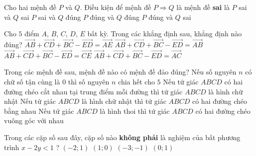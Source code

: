 \begin{ex}%
Cho hai mệnh đề $P$ và $Q$. Điều kiện để mệnh đề $P\Rightarrow Q$ là mệnh đề \textbf{sai} là
\choice
{$P$ sai và $Q$ sai}
{$P$ sai và $Q$ đúng}
{$P$ đúng và $Q$ đúng}
{\True $P$ đúng và $Q$ sai}
\end{ex}

\begin{ex}%
Cho $5$ điểm $A$, $B$, $C$, $D$, $E$ bất kỳ. Trong các khẳng định sau, khẳng định nào đúng?
\choice
{\True $\vec{AB}+\vec{CD}+\vec{BC}-\vec{ED}=\vec{AE}$}
{$\vec{AB}+\vec{CD}+\vec{BC}-\vec{ED}=\vec{AB}$}
{$\vec{AB}+\vec{CD}+\vec{BC}-\vec{ED}=\vec{CE}$}
{$\vec{AB}+\vec{CD}+\vec{BC}-\vec{ED}=\vec{AC}$}
\end{ex}

\begin{ex}%
Trong các mệnh đề sau, mệnh đề nào có mệnh đề đảo đúng?
\choice
{Nếu số nguyên $n$ có chữ số tận cùng là $0$ thì số nguyên $n$ chia hết cho $5$}
{\True Nếu tứ giác $ABCD$ có hai đường chéo cắt nhau tại trung điểm mỗi đường thì tứ giác $ABCD$ là hình chữ nhật}
{Nếu tứ giác $ABCD$ là hình chữ nhật thì tứ giác $ABCD$ có hai đường chéo bằng nhau}
{Nếu tứ giác $ABCD$ là hình thoi thì tứ giác $ABCD$ có hai đường chéo vuông góc với nhau}
\end{ex}

\begin{ex}%
Trong các cặp số sau đây, cặp số nào \textbf{không phải} là nghiệm của bất phương trình $x-2y<1$ ?
\choice
{ $(-2 ; 1)$}
{\True $(1 ; 0)$}
{ $(-3 ;-1)$}
{ $(0 ; 1)$}
\end{ex}

